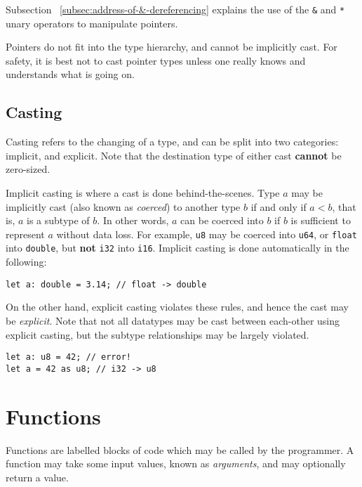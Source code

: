 \documentclass{article}
\begin{document}
    Subsection ~\ref{subsec:address-of-&-dereferencing} explains the use of the \texttt{\&} and \texttt{*} unary operators to manipulate pointers.

    Pointers do not fit into the type hierarchy, and cannot be implicitly cast.
    For safety, it is best not to cast pointer types unless one really knows and understands what is going on.

    \subsection{Casting}\label{subsec:type-casting}

    Casting refers to the changing of a type, and can be split into two categories: implicit, and explicit.
    Note that the destination type of either cast \textbf{cannot} be zero-sized.

    Implicit casting is where a cast is done behind-the-scenes.
    Type \(a\) may be implicitly cast (also known as \textit{coerced}) to another type \(b\) if and only if \(a < b\), that is, \(a\) is a subtype of \(b\).
    In other words, \(a\) can be coerced into \(b\) if \(b\) is sufficient to represent \(a\) without data loss.
    For example, \texttt{u8} may be coerced into \texttt{u64}, or \texttt{float} into \texttt{double}, but \textbf{not} \texttt{i32} into \texttt{i16}.
    Implicit casting is done automatically in the following:

    \begin{lstlisting}[language=CustomLang]
let a: double = 3.14; // float -> double
    \end{lstlisting}

    On the other hand, explicit casting violates these rules, and hence the cast may be \textit{explicit}.
    Note that not all datatypes may be cast between each-other using explicit casting, but the subtype relationships may be largely violated.

    \begin{lstlisting}[language=CustomLang]
let a: u8 = 42; // error!
let a = 42 as u8; // i32 -> u8
    \end{lstlisting}

    \section{Functions}\label{sec:functions}

    Functions are labelled blocks of code which may be called by the programmer.
    A function may take some input values, known as \textit{arguments}, and may optionally return a value.
\end{document}
